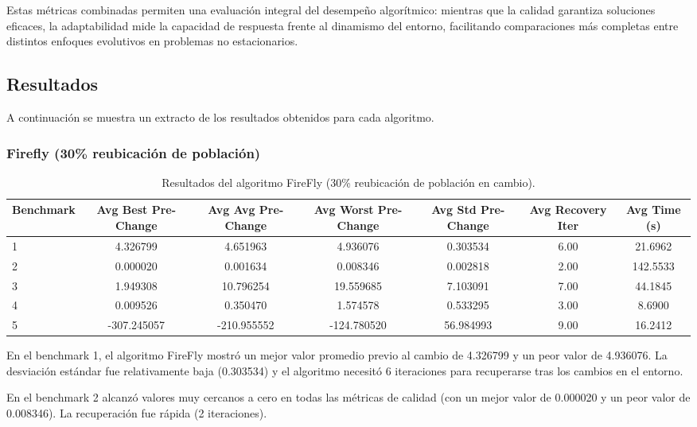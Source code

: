 \documentclass[10pt]{article}
\begin{document}
Estas métricas combinadas permiten una evaluación integral del desempeño algorítmico: mientras que la calidad garantiza soluciones eficaces, la adaptabilidad mide la capacidad de respuesta frente al dinamismo del entorno, facilitando comparaciones más completas entre distintos enfoques evolutivos en problemas no estacionarios.


\subsection*{Resultados}

A continuación se muestra un extracto de los resultados obtenidos para cada algoritmo. 

\subsubsection*{Firefly (30\% reubicación de población)}
\begin{table}[H]
\centering
\caption{Resultados del algoritmo FireFly (30\% reubicación de población en cambio).}
\label{tab:firefly}
\scriptsize
\begin{tabular}{lcccccc}
\toprule
\textbf{Benchmark} & \textbf{Avg Best Pre-Change} & \textbf{Avg Avg Pre-Change} & \textbf{Avg Worst Pre-Change} & \textbf{Avg Std Pre-Change} & \textbf{Avg Recovery Iter} & \textbf{Avg Time (s)} \\
\midrule
1 & 4.326799 & 4.651963 & 4.936076 & 0.303534 & 6.00 & 21.6962 \\
2 & 0.000020 & 0.001634 & 0.008346 & 0.002818 & 2.00 & 142.5533 \\
3 & 1.949308 & 10.796254 & 19.559685 & 7.103091 & 7.00 & 44.1845 \\
4 & 0.009526 & 0.350470 & 1.574578 & 0.533295 & 3.00 & 8.6900 \\
5 & -307.245057 & -210.955552 & -124.780520 & 56.984993 & 9.00 & 16.2412 \\
\bottomrule
\end{tabular}
\end{table}

En el benchmark 1, el algoritmo FireFly mostró un mejor valor promedio previo al cambio de 4.326799 y un peor valor de 4.936076. La desviación estándar fue relativamente baja (0.303534) y el algoritmo necesitó 6 iteraciones para recuperarse tras los cambios en el entorno.

En el benchmark 2 alcanzó valores muy cercanos a cero en todas las métricas de calidad (con un mejor valor de 0.000020 y un peor valor de 0.008346). La recuperación fue rápida (2 iteraciones).
\end{document}
